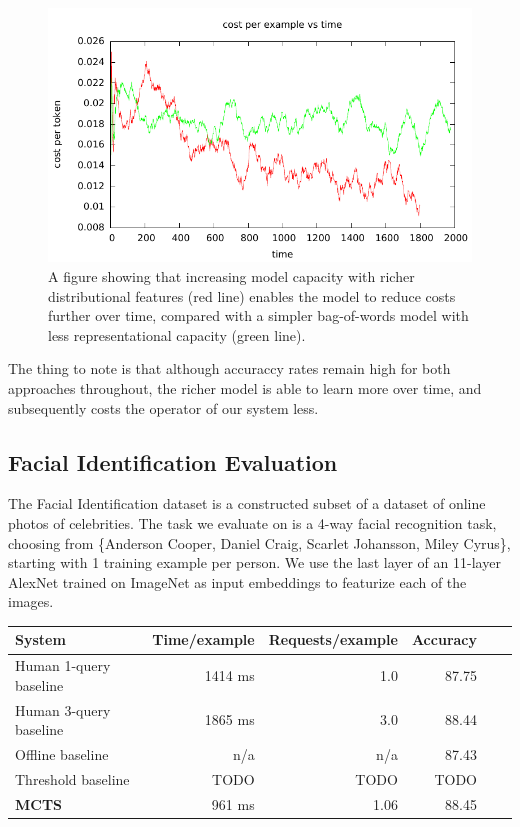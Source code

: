 \begin{figure}[t]
  \begin{centering}
  \includegraphics[width=1.0\textwidth]{figures/sentiment_cost_per_token_vs_time/cost_per_token_vs_time.pdf}
  \end{centering}
  \caption{A figure showing that increasing model capacity with richer distributional features (red line) enables the model to reduce costs further over time, compared with a simpler bag-of-words model with less representational capacity (green line).}
\label{fig:crf}
\end{figure}

The thing to note is that although accuraccy rates remain high for both approaches throughout, the richer model is able to learn more over time, and subsequently costs the operator of our system less.

\subsection{Facial Identification Evaluation}

The Facial Identification dataset is a constructed subset of a dataset of online photos of celebrities. The task we evaluate on is a 4-way facial recognition task, choosing from \{Anderson Cooper, Daniel Craig, Scarlet Johansson, Miley Cyrus\}, starting with 1 training example per person. We use the last layer of an 11-layer AlexNet trained on ImageNet as input embeddings to featurize each of the images.

\begin{center}
\begin{tabular}{ | l | r | r | r | r | r | }
    \hline
    \textbf{System} & \textbf{Time/example} & \textbf{Requests/example} & \textbf{Accuracy} \\ \hline
    Human 1-query baseline & 1414 ms & 1.0 & 87.75 \\ \hline
    Human 3-query baseline & 1865 ms & 3.0 & 88.44 \\ \hline
    Offline baseline & n/a & n/a & 87.43 \\ \hline
    Threshold baseline & TODO & TODO & TODO \\ \hline
    \textbf{MCTS} & 961 ms & 1.06 & 88.45 \\ \hline
\end{tabular}
\end{center}


